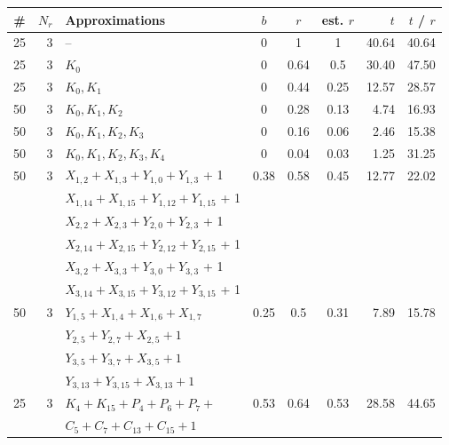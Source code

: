 \begin{table}[ht]
\begin{small}
\begin{center}
\begin{tabular}{|c|r|l|c|c|c|r|r|}
\hline
\#	& $N_r$ & Approximations & $b$ & $r$ & est. $r$ & $t$ & $t$ / $r$\\
\hline

25 & 3 & -- & 0 & 1 & 1 & 40.64 & 40.64\\

\hline %

25 & 3 & $K_{0}$				& 0 & 0.64 & 0.5 & 30.40	 & 47.50\\
\hline
25 & 3 & $K_{0},K_{1}$			& 0 & 0.44 & 0.25 & 12.57 & 28.57\\
\hline
50 & 3 & $K_{0},K_{1},K_{2}$		& 0 & 0.28 & 0.13 & 4.74 & 16.93\\
\hline
50 & 3 & $K_{0},K_{1},K_{2},K_{3}$	& 0 & 0.16 & 0.06 & 2.46 & 15.38\\
\hline
50 & 3 & $K_{0},K_{1},K_{2},K_{3},K_{4}$	& 0 & 0.04 & 0.03 & 1.25 & 31.25\\

\hline %

50 & 3 &  $X_{1, 2} + X_{1, 3} + Y_{1, 0} + Y_{1, 3}$ + 1 & 0.38 & 0.58 & 0.45 & 12.77 & 22.02\\
   &   &  $X_{1,14} + X_{1,15} + Y_{1,12} + Y_{1,15}$ + 1 & & & & & \\
   &   &  $X_{2, 2} + X_{2, 3} + Y_{2, 0} + Y_{2, 3}$ + 1 & & & & & \\
   &   &  $X_{2,14} + X_{2,15} + Y_{2,12} + Y_{2,15}$ + 1 & & & & & \\
   &   &  $X_{3, 2} + X_{3, 3} + Y_{3, 0} + Y_{3, 3}$ + 1 & & & & & \\
   &   &  $X_{3,14} + X_{3,15} + Y_{3,12} + Y_{3,15}$ + 1 & & & & & \\

\hline   %

50 & 3 & $Y_{1, 5} + X_{1, 4} + X_{1, 6} + X_{1, 7}$ & 0.25 & 0.5 & 0.31 & 7.89 & 15.78\\
   &   & $Y_{2, 5} + Y_{2, 7} + X_{2, 5} + 1$ & & & & & \\
   &   & $Y_{3, 5} + Y_{3, 7} + X_{3, 5} + 1$ & & & & & \\
   &   & $Y_{3,13} + Y_{3,15} + X_{3,13} + 1$ & & & & & \\

\hline %
25 & 3 & $K_{4} + K_{15} + P_{4} + P_{6} + P_{7} +$ & 0.53 & 0.64 & 0.53 & 28.58 & 44.65\\
   &   & $C_{5} + C_{7} + C_{13} + C_{15} + 1$ & & & & & \\


\end{tabular}
\end{center}
\end{small}
\end{table}
